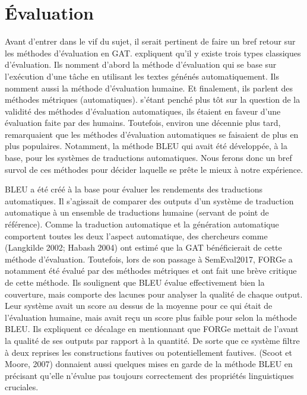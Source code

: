 \section{Évaluation}

Avant d'entrer dans le vif du sujet, il serait pertinent de faire un bref retour sur les méthodes d'évaluation en \ac{GAT}. \cite{ReiterInvestigationValidityMetrics2009} expliquent qu'il y existe trois types classiques d'évaluation. Ils nomment d'abord la méthode d'évaluation qui se base sur l'exécution d'une tâche en utilisant les textes génénés automatiquement. Ils nomment aussi la méthode d'évaluation humaine. Et finalement, ils parlent des méthodes métriques (automatiques). \cite{ReiterBuildingNaturalLanguage2000} s'étant penché plus tôt sur la question de la validité des méthodes d'évaluation automatiques, ils étaient en faveur d'une évaluation faite par des humains. Toutefois, environ une décennie plus tard, \cite{ReiterInvestigationValidityMetrics2009} remarquaient que les méthodes d'évaluation automatiques se faisaient de plus en plus populaires. Notamment, la méthode BLEU qui avait été développée, à la base, pour les systèmes de traductions automatiques. Nous ferons donc un bref survol de ces méthodes pour décider laquelle se prête le mieux à notre expérience.

BLEU a été créé à la base pour évaluer les rendements des traductions automatiques. Il s'agissait de comparer des outputs d'un système de traduction automatique à un ensemble de traductions humaine (servant de point de référence). Comme la traduction automatique et la génération automatique comportent toutes les deux l'aspect automatique, des chercheurs comme (Langkilde 2002; Habash 2004) ont estimé que la \ac{GAT} bénéficierait de cette méthode d'évaluation. Toutefois, lors de son passage à SemEval2017, FORGe a notamment été évalué par des méthodes métriques et \cite{DBLP:conf/semeval/MilleCBW17} ont fait une brève critique de cette méthode. Ils soulignent que BLEU évalue effectivement bien la couverture, mais comporte des lacunes pour analyser la qualité de chaque output. Leur système avait un score au dessus de la moyenne pour ce qui était de l'évaluation humaine, mais avait reçu un score plus faible pour selon la méthode BLEU. Ils expliquent ce décalage en mentionnant que FORGe mettait de l'avant la qualité de ses outputs par rapport à la quantité. De sorte que ce système filtre à deux reprises les constructions fautives ou potentiellement fautives. (Scoot et Moore, 2007) donnaient aussi quelques mises en garde de la méthode BLEU en précisant qu'elle n'évalue pas toujours correctement des propriétés linguistiques cruciales.

